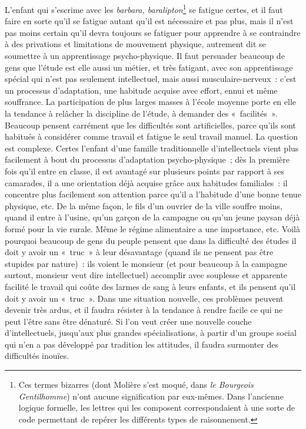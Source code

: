 \documentclass[french,twoside]{book} %
\begin{document}
L'enfant qui s’escrime avec les \emph{barbara, baralipton}\footnote{Ces termes bizarres (dont Molière s’est moqué, dans \emph{le Bourgeois Gentilhomme}) n’ont aucune signification par eux-mêmes. Dans l’ancienne logique formelle, les lettres qui les composent correspondaient à une sorte de code permettant de repérer les différents types de raisonnement.} se fatigue certes, et il faut faire en sorte qu’il se fatigue autant qu’il est nécessaire et pas plus, mais il n’est pas moins certain qu’il devra toujours se fatiguer pour apprendre à se contraindre à des privations et limitations de mouvement physique, autrement dit se soumettre à un apprentissage psycho-physique. Il faut persuader beaucoup de gens que l’étude est elle aussi un métier, et très fatigant, avec son apprentissage spécial qui n’est pas seulement intellectuel, mais aussi musculaire-nerveux : c’est un processus d’adaptation, une habitude acquise avec effort, ennui et même souffrance. La participation de plus larges masses à l’école moyenne porte en elle la tendance à relâcher la discipline de l’étude, à demander des « facilités ». Beaucoup pensent carrément que les difficultés sont artificielles, parce qu’ils sont habitués à considérer comme travail et fatigue le seul travail manuel. La question est complexe. Certes l’enfant d’une famille traditionnelle d’intellectuels vient plus facilement à bout du processus d’adaptation psycho-physique ; dès la première fois qu’il entre en classe, il est avantagé sur plusieurs points par rapport à ses camarades, il a une orientation déjà acquise grâce aux habitudes familiales : il concentre plus facilement son attention parce qu’il a l’habitude d’une bonne tenue physique, etc. De la même façon, le fils d’un ouvrier de la ville souffre moins, quand il entre à l’usine, qu’un garçon de la campagne ou qu’un jeune paysan déjà formé pour la vie rurale. Même le régime alimentaire a une importance, etc. Voilà pourquoi beaucoup de gens du peuple pensent que dans la difficulté des études il doit y avoir un « truc » à leur désavantage (quand ils ne pensent pas être stupides par nature) : ils voient le monsieur (et pour beaucoup à la campagne surtout, monsieur veut dire intellectuel) accomplir avec souplesse et apparente facilité le travail qui coûte des larmes de sang à leurs enfants, et ils pensent qu’il doit y avoir un « truc ». Dans une situation nouvelle, ces problèmes peuvent devenir très ardus, et il faudra résister à la tendance à rendre facile ce qui ne peut l’être sans être dénaturé. Si l’on veut créer une nouvelle couche d’intellectuels, jusqu’aux plus grandes spécialisations, à partir d’un groupe social qui n’en a pas développé par tradition les attitudes, il faudra surmonter des difficultés inouïes.
\end{document}
